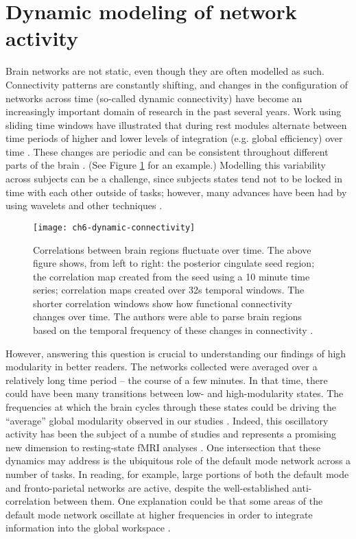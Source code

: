 \section{Dynamic modeling of network activity}

Brain networks are not static, even though they are often modelled as such. Connectivity patterns are constantly shifting, and changes in the configuration of networks across time (so-called dynamic connectivity) have become an increasingly important domain of research in the past several years. Work using sliding time windows have illustrated that during rest modules alternate between time periods of higher and lower levels of integration (e.g. global efficiency) over time \citep{Zalesky2014}. These changes are periodic and can be consistent throughout different parts of the brain \citep{Handwerker2012}. (See Figure \ref{fig:ch6-dynamic-connectivity} for an example.) Modelling this variability across subjects can be a challenge, since subjects states tend not to be locked in time with each other outside of tasks; however, many advances have been had by using wavelets and other techniques \citep{Zalesky2014}. 

\begin{figure}[t]
	\centering
	\texttt{[image: ch6-dynamic-connectivity]}
	\caption[Correlations between brain regions fluctuate over time.]{Correlations between brain regions fluctuate over time. The above figure shows, from left to right: the posterior cingulate seed region; the correlation map created from the seed using a 10 minute time series; correlation maps created over 32s temporal windows. The shorter correlation windows show how functional connectivity changes over time. The authors were able to parse brain regions based on the temporal frequency of these changes in connectivity \citep{Handwerker2012}.}
	\label{fig:ch6-dynamic-connectivity}
\end{figure}

However, answering this question is crucial to understanding our findings of high modularity in better readers. The networks collected were averaged over a relatively long time period -- the course of a few minutes. In that time, there could have been many transitions between low- and high-modularity states. The frequencies at which the brain cycles through these states could be driving the ``average'' global modularity observed in our studies \citep{Fries2005}. Indeed, this oscillatory activity has been the subject of a numbe of studies and represents a promising new dimension to resting-state fMRI analyses \citep{Hutchison2013}. One intersection that these dynamics may address is the ubiquitous role of the default mode network across a number of tasks. In reading, for example, large portions of both the default mode and fronto-parietal networks are active, despite the well-established anti-correlation between them. One explanation could be that some areas of the default mode network oscillate at higher frequencies in order to integrate information into the global workspace \citep{Vatansever2015}.

